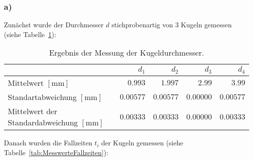            \subsubsection{a)}

            Zunächst wurde der Durchmesser $d$ stichprobenartig von $3$ Kugeln gemessen (siehe Tabelle~\ref{tab:MesswerteDurchmesser}):

            \begin{table}[H]
                \centering
                \caption{Ergebnis der Messung der Kugeldurchmesser.}
                \vspace*{.5em}
                \begin{tabular}{|l||r||r|r|r|}
                    \hline
                    & $d_{1}$ & $d_{2}$ & $d_{3}$ & $d_{4}$\\
                    \hline \hline
                    Mittelwert $[\mathrm{mm}]$ & $0.993$ & $1.997$ & $2.99$ & $3.99$\\
                    Standartabweichung $[\mathrm{mm}]$ & $0.00577$ & $0.00577$ & $0.00000$ & $0.00577$\\
                    Mittelwert der Standardabweichung $[\mathrm{mm}]$ & $0.00333$ & $0.00333$ & $0.00000$ & $0.00333$\\
                    \hline
                \end{tabular}
                \label{tab:MesswerteDurchmesser}
            \end{table}

            Danach wurden die Fallzeiten $t_{i}$ der Kugeln gemessen (siehe Tabelle~\ref{tab:MesswerteFallzeiten}):

